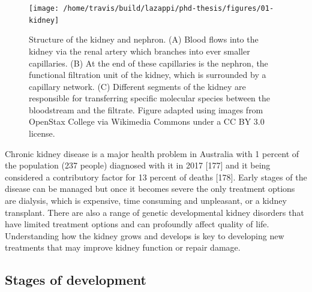 \documentclass[11pt,a4paper,titlepage,twoside,openright]{style/unimelbthesis}
\theoremstyle{definition}
\theoremstyle{definition}
\theoremstyle{definition}
\theoremstyle{remark}
\begin{document}
\begin{mainmatter}
\begin{figure}

{\centering \texttt{[image: /home/travis/build/lazappi/phd-thesis/figures/01-kidney]} 

}

\caption[Structure of the kidney and nephron.]{Structure of the kidney and nephron. (A) Blood flows into the kidney via the renal artery which branches into ever smaller capillaries. (B) At the end of these capillaries is the nephron, the functional filtration unit of the kidney, which is surrounded by a capillary network. (C) Different segments of the kidney are responsible for transferring specific molecular species between the bloodstream and the filtrate. Figure adapted using images from OpenStax College via Wikimedia Commons under a CC BY 3.0 license.}\label{fig:kidney}
\end{figure}





Chronic kidney disease is a major health problem in Australia with 1 percent of the population (237 people) diagnosed with it in 2017 {[}177{]} and it being considered a contributory factor for 13 percent of deaths {[}178{]}. Early stages of the disease can be managed but once it becomes severe the only treatment options are dialysis, which is expensive, time consuming and unpleasant, or a kidney transplant. There are also a range of genetic developmental kidney disorders that have limited treatment options and can profoundly affect quality of life. Understanding how the kidney grows and develops is key to developing new treatments that may improve kidney function or repair damage.

\hypertarget{stages-of-development}{%
\subsection{Stages of development}\label{stages-of-development}}


\end{mainmatter}
\end{document}
